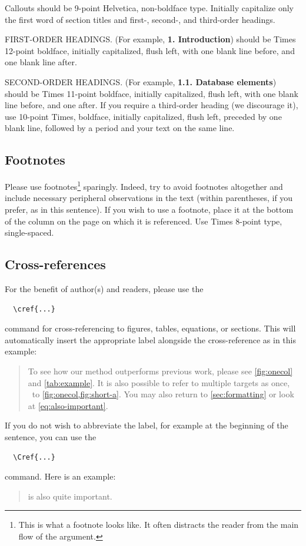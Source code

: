 \documentclass[10pt,twocolumn,letterpaper]{article}
\begin{document}
\noindent Callouts should be 9-point Helvetica, non-boldface type.
Initially capitalize only the first word of section titles and first-, second-, and third-order headings.

FIRST-ORDER HEADINGS.
(For example, {\large \bf 1. Introduction}) should be Times 12-point boldface, initially capitalized, flush left, with one blank line before, and one blank line after.

SECOND-ORDER HEADINGS.
(For example, { \bf 1.1. Database elements}) should be Times 11-point boldface, initially capitalized, flush left, with one blank line before, and one after.
If you require a third-order heading (we discourage it), use 10-point Times, boldface, initially capitalized, flush left, preceded by one blank line, followed by a period and your text on the same line.

\subsection{Footnotes}

Please use footnotes\footnote{This is what a footnote looks like.
It often distracts the reader from the main flow of the argument.} sparingly.
Indeed, try to avoid footnotes altogether and include necessary peripheral observations in the text (within parentheses, if you prefer, as in this sentence).
If you wish to use a footnote, place it at the bottom of the column on the page on which it is referenced.
Use Times 8-point type, single-spaced.


\subsection{Cross-references}

For the benefit of author(s) and readers, please use the
{\small\begin{verbatim}
  \cref{...}
\end{verbatim}}  command for cross-referencing to figures, tables, equations, or sections.
This will automatically insert the appropriate label alongside the cross-reference as in this example:
\begin{quotation}
  To see how our method outperforms previous work, please see \cref{fig:onecol} and \cref{tab:example}.
  It is also possible to refer to multiple targets as once, \eg~to \cref{fig:onecol,fig:short-a}.
  You may also return to \cref{sec:formatting} or look at \cref{eq:also-important}.
\end{quotation}
If you do not wish to abbreviate the label, for example at the beginning of the sentence, you can use the
{\small\begin{verbatim}
  \Cref{...}
\end{verbatim}}
command. Here is an example:
\begin{quotation}
   is also quite important.
\end{quotation}
\end{document}
